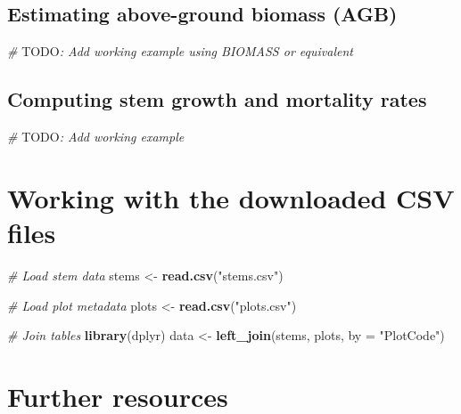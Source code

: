 \documentclass[
]{book}
\newenvironment{Shaded}{\begin{snugshade}}{\end{snugshade}}
\newcommand{\AlertTok}[1]{\textcolor[rgb]{0.94,0.16,0.16}{#1}}
\newcommand{\AttributeTok}[1]{\textcolor[rgb]{0.13,0.29,0.53}{#1}}
\newcommand{\CommentTok}[1]{\textcolor[rgb]{0.56,0.35,0.01}{\textit{#1}}}
\newcommand{\FunctionTok}[1]{\textcolor[rgb]{0.13,0.29,0.53}{\textbf{#1}}}
\newcommand{\NormalTok}[1]{#1}
\newcommand{\OtherTok}[1]{\textcolor[rgb]{0.56,0.35,0.01}{#1}}
\newcommand{\StringTok}[1]{\textcolor[rgb]{0.31,0.60,0.02}{#1}}
\begin{document}
\subsection{Estimating above-ground biomass (AGB)}\label{estimating-above-ground-biomass-agb}

\begin{Shaded}
\begin{Highlighting}[]
\CommentTok{\# }\AlertTok{TODO}\CommentTok{: Add working example using BIOMASS or equivalent}
\end{Highlighting}
\end{Shaded}

\subsection{Computing stem growth and mortality rates}\label{computing-stem-growth-and-mortality-rates}

\begin{Shaded}
\begin{Highlighting}[]
\CommentTok{\# }\AlertTok{TODO}\CommentTok{: Add working example}
\end{Highlighting}
\end{Shaded}

\section{Working with the downloaded CSV files}\label{working-with-the-downloaded-csv-files}

\begin{Shaded}
\begin{Highlighting}[]
\CommentTok{\# Load stem data}
\NormalTok{stems }\OtherTok{\textless{}{-}} \FunctionTok{read.csv}\NormalTok{(}\StringTok{"stems.csv"}\NormalTok{)}

\CommentTok{\# Load plot metadata}
\NormalTok{plots }\OtherTok{\textless{}{-}} \FunctionTok{read.csv}\NormalTok{(}\StringTok{"plots.csv"}\NormalTok{)}

\CommentTok{\# Join tables}
\FunctionTok{library}\NormalTok{(dplyr)}
\NormalTok{data }\OtherTok{\textless{}{-}} \FunctionTok{left\_join}\NormalTok{(stems, plots, }\AttributeTok{by =} \StringTok{"PlotCode"}\NormalTok{)}
\end{Highlighting}
\end{Shaded}

\section{Further resources}\label{further-resources}
\end{document}
